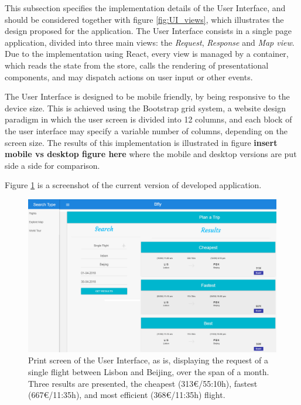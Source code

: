 This subsection specifies the implementation details of the User Interface,
and should be considered together with figure \ref{fig:UI_views},
which illustrates the design proposed for the application.
The User Interface consists in a single page application,
divided into three main views: the \textit{Request}, \textit{Response} and \textit{Map view}.
Due to the implementation using React, every view is managed by a container,
which reads the state from the store, calls the rendering of presentational components,
and may dispatch actions on user input or other events. 

The User Interface is designed to be mobile friendly, by being responsive to the 
device size. This is achieved using the Bootstrap grid system, 
a website design paradigm in which the user screen is divided into 12 columns,
and each block of the user interface may specify a variable number of columns, depending on the screen size.
The results of this implementation is illustrated in figure \textbf{insert mobile vs desktop figure here}
where the mobile and desktop versions are put side a side for comparison.

Figure \ref{fig:user_interface_example} is a screenshot of the current version 
of developed application.


\begin{figure}[htpb]
  \centering
  \includegraphics[width=\textwidth]{./Figures/system_implementation/user_interface_example.png}
  \caption{Print screen of the User Interface, as is, displaying the request 
  of a single flight between Lisbon and Beijing, over the span of a month. Three results 
  are presented, the cheapest (313€/55:10h), fastest (667€/11:35h), and most efficient (368€/11:35h) flight.}
  \label{fig:user_interface_example}  
\end{figure}